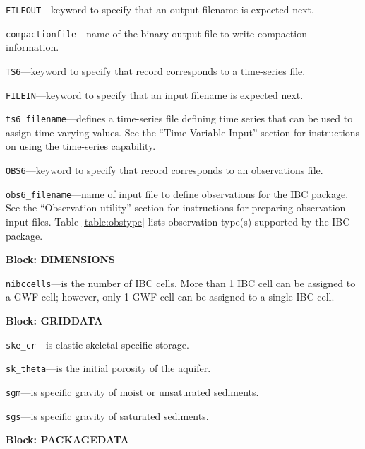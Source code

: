 \begin{description}
\item \texttt{FILEOUT}---keyword to specify that an output filename is expected next.

\item \texttt{compactionfile}---name of the binary output file to write compaction information.

\item \texttt{TS6}---keyword to specify that record corresponds to a time-series file.

\item \texttt{FILEIN}---keyword to specify that an input filename is expected next.

\item \texttt{ts6\_filename}---defines a time-series file defining time series that can be used to assign time-varying values. See the ``Time-Variable Input'' section for instructions on using the time-series capability.

\item \texttt{OBS6}---keyword to specify that record corresponds to an observations file.

\item \texttt{obs6\_filename}---name of input file to define observations for the IBC package. See the ``Observation utility'' section for instructions for preparing observation input files. Table \ref{table:obstype} lists observation type(s) supported by the IBC package.

\end{description}
\item \textbf{Block: DIMENSIONS}

\begin{description}
\item \texttt{nibccells}---is the number of IBC cells.  More than 1 IBC cell can be assigned to a GWF cell; however, only 1 GWF cell can be assigned to a single IBC cell.

\end{description}
\item \textbf{Block: GRIDDATA}

\begin{description}
\item \texttt{ske\_cr}---is elastic skeletal specific storage.

\item \texttt{sk\_theta}---is the initial porosity of the aquifer.

\item \texttt{sgm}---is specific gravity of moist or unsaturated sediments.

\item \texttt{sgs}---is specific gravity of saturated sediments.

\end{description}
\item \textbf{Block: PACKAGEDATA}

